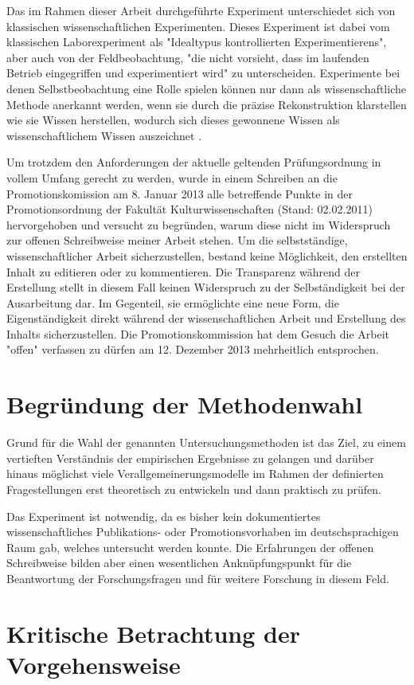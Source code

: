 Das im Rahmen dieser Arbeit durchgeführte Experiment unterschiedet sich von klassischen wissenschaftlichen Experimenten. Dieses Experiment ist dabei vom klassischen Laborexperiment als "Idealtypus kontrollierten Experimentierens", aber auch von der Feldbeobachtung, "die nicht vorsieht, dass im laufenden Betrieb eingegriffen und experimentiert wird" \cite{FQS196} zu unterscheiden. Experimente bei denen Selbstbeobachtung eine Rolle spielen können nur dann als wissenschaftliche Methode anerkannt werden, wenn sie durch die präzise Rekonstruktion klarstellen wie sie Wissen herstellen, wodurch sich dieses gewonnene Wissen als wissenschaftlichem Wissen auszeichnet \cite{solhdju_2011_selbstexperimente}.

Um trotzdem den Anforderungen der aktuelle geltenden Prüfungsordnung in vollem Umfang gerecht zu werden, wurde in einem Schreiben an die Promotionskomission am 8. Januar 2013 alle betreffende Punkte in der Promotionsordnung der Fakultät Kulturwissenschaften (Stand: 02.02.2011) hervorgehoben und versucht zu begründen, warum diese nicht im Widerspruch zur offenen Schreibweise meiner Arbeit stehen. Um die selbstständige, wissenschaftlicher Arbeit sicherzustellen, bestand keine Möglichkeit, den erstellten Inhalt zu editieren oder zu kommentieren. Die Transparenz während der Erstellung stellt in diesem Fall keinen Widerspruch zu der Selbständigkeit bei der Ausarbeitung dar. Im Gegenteil, sie ermöglichte eine neue Form, die Eigenständigkeit direkt während der wissenschaftlichen Arbeit und Erstellung des Inhalts sicherzustellen. Die Promotionskommission hat dem Gesuch die Arbeit "offen" verfassen zu dürfen am 12. Dezember 2013 mehrheitlich entsprochen.

\section{Begründung der Methodenwahl}

Grund für die Wahl der genannten Untersuchungsmethoden ist das Ziel, zu einem vertieften Verständnis der empirischen Ergebnisse zu gelangen und darüber hinaus möglichst viele Verallgemeinerungsmodelle im Rahmen der definierten Fragestellungen erst theoretisch zu entwickeln und dann praktisch zu prüfen.

Das Experiment ist notwendig, da es bisher kein dokumentiertes wissenschaftliches Publikations- oder Promotionsvorhaben im deutschsprachigen Raum gab, welches untersucht werden konnte. Die Erfahrungen der offenen Schreibweise bilden aber einen wesentlichen Anknüpfungspunkt für die Beantwortung der Forschungsfragen und für weitere Forschung in diesem Feld.

\section{Kritische Betrachtung der Vorgehensweise}

